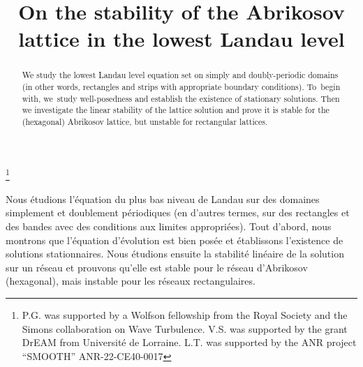 \documentclass[JEP,XML,SOM,Unicode,NoFloatCountersInSection,published]{cedram}
\theoremstyle{definition}
\begin{document}
\frontmatter
\title{On the stability of the Abrikosov lattice in the lowest Landau level}

\author[\initial{P.} \lastname{Germain}]{ }
\address{Department of Mathematics, Imperial College London,\\
Huxley building, South Kensington campus, London SW7 2AZ, United Kingdom}

\author[\initial{V.} \lastname{Schwinte}]{ }
\address{Université de Lorraine, CNRS, IECL,\\
F-54000 Nancy, France}

\author[\initial{L.} \lastname{Thomann}]{ }
\address{Université de Lorraine, CNRS, IECL,\\
F-54000 Nancy, France}

\thanks{P.G. was supported by a Wolfson fellowship from the Royal Society and the Simons collaboration on Wave Turbulence. V.S. was supported by the grant DrEAM from Université de Lorraine. L.T. was supported by the ANR project ``SMOOTH'' ANR-22-CE40-0017}

\begin{abstract}
We study the lowest Landau level equation set on simply and doubly-periodic domains (in other words, rectangles and strips with appropriate boundary conditions). To~begin with, we~study well-posedness and establish the existence of stationary solutions. Then we investigate the linear stability of the lattice solution and prove it is stable for the (hexagonal) Abrikosov lattice, but unstable for rectangular lattices.
\end{abstract}





\begin{altabstract}
Nous étudions l'équation du plus bas niveau de Landau sur des domaines simplement et doublement périodiques (en d'autres termes, sur des rectangles et des bandes avec des conditions aux limites appropriées). Tout d'abord, nous montrons que l'équation d'évolution est bien posée et établissons l'existence de solutions stationnaires. Nous étudions ensuite la stabilité linéaire de la solution sur un réseau et prouvons qu'elle est stable pour le réseau d'Abrikosov (hexagonal), mais instable pour les réseaux rectangulaires.
\end{altabstract}
\end{document}
